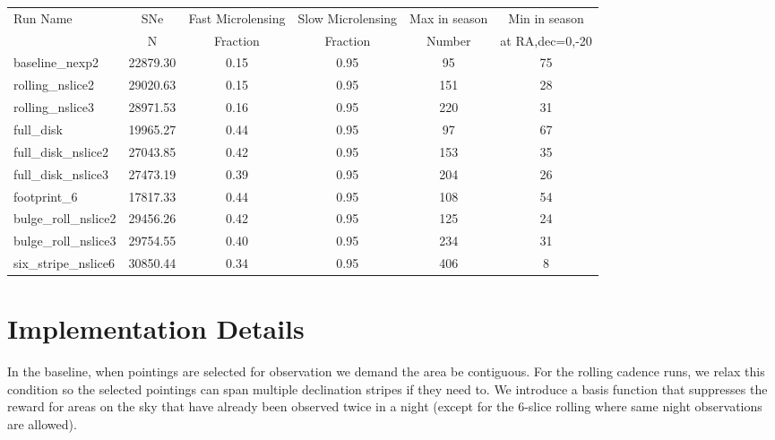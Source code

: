 \documentclass[modern]{aastex62}
\begin{document}
\begin{table}
\begin{tabular}{lccccc}\label{tab:metrics}

 Run Name &  SNe &  Fast Microlensing &  Slow Microlensing &  Max in season &  Min in season \\
 &           N    & Fraction  & Fraction     &   Number & at RA,dec=0,-20 \\
\toprule

baseline\_nexp2 &              22879.30 &                    0.15 &                    0.95 &     95 &     75 \\
rolling\_nslice2 &             29020.63 &                    0.15 &                    0.95 &    151 &     28 \\
rolling\_nslice3 &             28971.53 &                    0.16 &                    0.95 &    220 &     31 \\

\hline
full\_disk &                      19965.27 &                    0.44 &                    0.95 &     97 &     67 \\
full\_disk\_nslice2 &             27043.85 &                    0.42 &                    0.95 &    153 &     35 \\
full\_disk\_nslice3 &             27473.19 &                    0.39 &                    0.95 &    204 &     26 \\
                                                             
\hline
footprint\_6 &                     17817.33 &                    0.44 &                    0.95 &    108 &     54 \\
bulge\_roll\_nslice2 &             29456.26 &                    0.42 &                    0.95 &    125 &     24 \\
bulge\_roll\_nslice3 &             29754.55 &                    0.40 &                    0.95 &    234 &     31 \\
six\_stripe\_nslice6 &             30850.44 &                    0.34 &                    0.95 &    406 &      8 \\
\hline
\end{tabular}
\end{table}


\section{Implementation Details}


In the baseline, when pointings are selected for observation we demand the area be contiguous. For the rolling cadence runs, we relax this condition so the selected pointings can span multiple declination stripes if they need to.  We introduce a basis function that suppresses the reward for areas on the sky that have already been observed twice in a night (except for the 6-slice rolling where same night observations are allowed).
\end{document}
